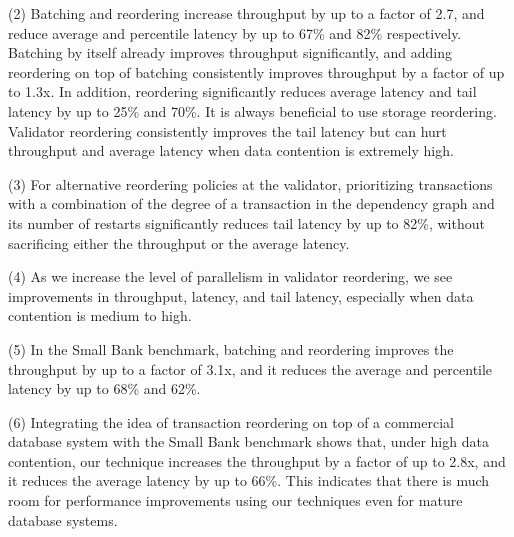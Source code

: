 (2) Batching and reordering increase throughput by up to a factor of 2.7, and reduce average and percentile latency by up to 67\% and 82\% respectively.
Batching by itself already improves throughput significantly, and adding reordering on top of batching consistently improves throughput by a factor of up to 1.3x. In addition, reordering significantly reduces average latency and tail latency by up to 25\% and 70\%. It is always beneficial to use storage reordering. Validator reordering consistently improves the tail latency but can hurt throughput and average latency when data contention is extremely high.

(3) For alternative reordering policies at the validator, prioritizing transactions with a combination of the degree of a transaction in the dependency graph and its number of restarts significantly reduces tail latency by up to 82\%, without sacrificing either the throughput or the average latency.

(4) As we increase the level of parallelism in validator reordering, we see improvements in throughput, latency, and tail latency, especially when data contention is medium to high.

(5) In the Small Bank benchmark, batching and reordering improves the throughput by up to a factor of 3.1x, and it reduces the average and percentile latency by up to 68\% and 62\%.

(6) Integrating the idea of transaction reordering on top of a commercial database system with the Small Bank benchmark shows that, under high data contention, our technique increases the throughput by a factor of up to 2.8x, and it reduces the average latency by up to 66\%. This indicates that there is much room for performance improvements using our techniques even for mature database systems.
